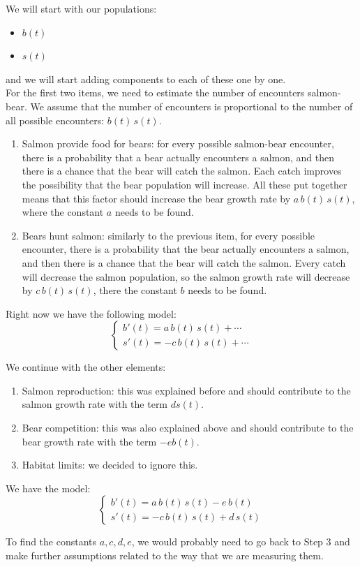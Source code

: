 \begin{example}
We will start with our populations:
\begin{itemize}
	\item $b(t)$
	\item $s(t)$
\end{itemize}
and we will start adding components to each of these one by one. \\

For the first two items, we need to estimate the number of encounters salmon-bear. We assume that the number of encounters is proportional to the number of all possible encounters: \emph{$b(t)\, s(t)$}.

\begin{enumerate}
	\item Salmon provide food for bears: for every possible salmon-bear encounter, there is a probability that a bear actually encounters a salmon, and then there is a chance that the bear will catch the salmon. Each catch improves the possibility that the bear population will increase. All these put together means that this factor should increase the bear growth rate by \emph{$a \,b(t)\, s(t)$}, where the constant $a$ needs to be found.
	\item Bears hunt salmon: similarly to the previous item, for every possible encounter, there is a probability that the bear actually encounters a salmon, and then there is a chance that the bear will catch the salmon. Every catch will decrease the salmon population, so the salmon growth rate will decrease by \emph{$c \,b(t) \,s(t)$}, there the constant $b$ needs to be found.
\end{enumerate}

Right now we have the following model:
$$
\begin{cases}
b'(t) = a \,b(t)\, s(t) + \cdots \\
s'(t) = - c \,b(t)\, s(t) + \cdots	
\end{cases}
$$

We continue with the other elements:
\begin{enumerate}[start=3]
	\item Salmon reproduction: this was explained before and should contribute to the salmon growth rate with the term \emph{$d s(t)$}.
	\item Bear competition: this was also explained above and should contribute to the bear growth rate with the term \emph{$-e b(t)$}.
	\item Habitat limits: we decided to ignore this.
\end{enumerate}

We have the model:
$$
\begin{cases}
b'(t) = a \, b(t) \,s(t) -e \, b(t) \\
s'(t) = - c \, b(t) \,s(t) + d \, s(t)
\end{cases}
$$

To find the constants $a,c,d,e$, we would probably need to go back to Step 3 and make further assumptions related to the way that we are measuring them.
\end{example}



